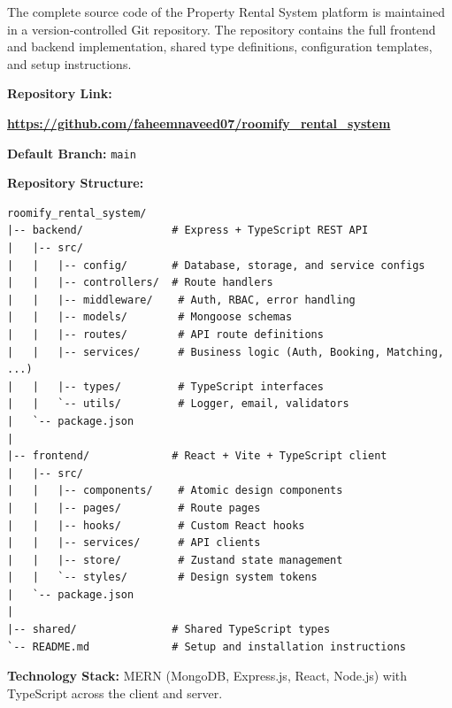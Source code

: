 
The complete source code of the Property Rental System platform is maintained in a version-controlled Git repository. The repository contains the full frontend and backend implementation, shared type definitions, configuration templates, and setup instructions.

\vspace{0.4cm}

\noindent
\textbf{Repository Link:}

\begin{center}
\textbf{\url{https://github.com/faheemnaveed07/roomify_rental_system}}
\end{center}

\vspace{0.5cm}

\noindent
\textbf{Default Branch:} \texttt{main}

\vspace{0.5cm}

\noindent
\textbf{Repository Structure:}

\begin{verbatim}
roomify_rental_system/
|-- backend/              # Express + TypeScript REST API
|   |-- src/
|   |   |-- config/       # Database, storage, and service configs
|   |   |-- controllers/  # Route handlers
|   |   |-- middleware/    # Auth, RBAC, error handling
|   |   |-- models/        # Mongoose schemas
|   |   |-- routes/        # API route definitions
|   |   |-- services/      # Business logic (Auth, Booking, Matching, ...)
|   |   |-- types/         # TypeScript interfaces
|   |   `-- utils/         # Logger, email, validators
|   `-- package.json
|
|-- frontend/             # React + Vite + TypeScript client
|   |-- src/
|   |   |-- components/    # Atomic design components
|   |   |-- pages/         # Route pages
|   |   |-- hooks/         # Custom React hooks
|   |   |-- services/      # API clients
|   |   |-- store/         # Zustand state management
|   |   `-- styles/        # Design system tokens
|   `-- package.json
|
|-- shared/               # Shared TypeScript types
`-- README.md             # Setup and installation instructions
\end{verbatim}

\vspace{0.5cm}

\noindent
\textbf{Technology Stack:} MERN (MongoDB, Express.js, React, Node.js) with TypeScript across the client and server.

